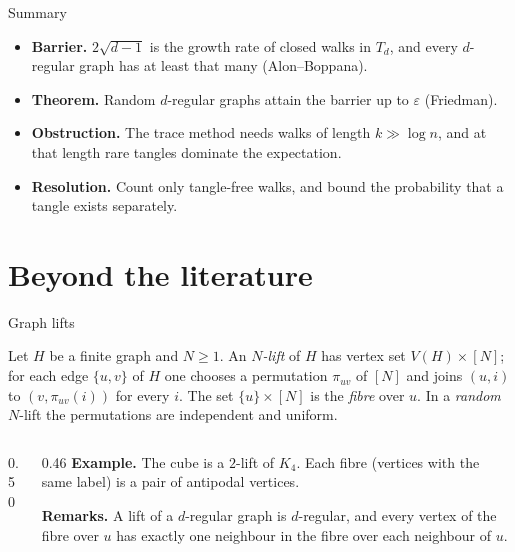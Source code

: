 \documentclass[aspectratio=169,10pt]{beamer}
\newcommand{\edge}{2\sqrt{d-1}}
\newcommand{\eps}{\varepsilon}
\begin{document}
\begin{frame}{Summary}
  \begin{itemize}
    \setlength{\itemsep}{3mm}
    \item \textbf{Barrier.} $\edge$ is the growth rate of closed walks in $T_d$, and every $d$-regular
          graph has at least that many (Alon--Boppana).
    \item \textbf{Theorem.} Random $d$-regular graphs attain the barrier up to $\eps$ (Friedman).
    \item \textbf{Obstruction.} The trace method needs walks of length $k\gg\log n$, and at that length
          rare tangles dominate the expectation.
    \item \textbf{Resolution.} Count only tangle-free walks, and bound the probability that a tangle exists separately.
  \end{itemize}
\end{frame}

\section{Beyond the literature}

\begin{frame}{Graph lifts}
  \begin{definition}
    Let $H$ be a finite graph and $N\ge1$. An \emph{$N$-lift} of $H$ has vertex set $V(H)\times[N]$;
    for each edge $\{u,v\}$ of $H$ one chooses a permutation $\pi_{uv}$ of $[N]$ and joins $(u,i)$ to
    $(v,\pi_{uv}(i))$ for every $i$. The set $\{u\}\times[N]$ is the \emph{fibre} over $u$. In a
    \emph{random} $N$-lift the permutations are independent and uniform.
  \end{definition}
  \begin{columns}[c,onlytextwidth]
    \begin{column}{0.50\textwidth}
      \centering
      
    \end{column}
    \begin{column}{0.46\textwidth}
      \textbf{Example.} The cube is a $2$-lift of $K_4$. Each fibre (vertices with the same label)
      is a pair of antipodal vertices.

      \textbf{Remarks.} A lift of a $d$-regular graph is $d$-regular, and every vertex of the
      fibre over $u$ has exactly one neighbour in the fibre over each neighbour of $u$.
    \end{column}
  \end{columns}
\end{frame}
\end{document}
